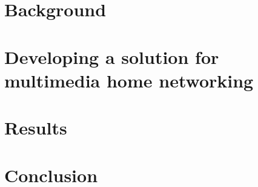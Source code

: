 \documentclass[english,12pt,a4paper,pdftex]{article}
\begin{document}
 

\clearpage

 \section{Background\label{chapter2}}
 


\clearpage

\section{Developing a solution for multimedia home networking\label{chapter3}}



\clearpage

\section{Results\label{chapter4}}



\clearpage

\section{Conclusion\label{chapter5}}



\clearpage



\cite{stateofHN}
\cite{AirPlay-spec}
\cite{next_generation}
\cite{DLNA_proxy2}
\cite{upnp}
\cite{standards-perspective}
\cite{DLNA_proxy}
\cite{end_user}
\cite{ipv6}



 

%
\end{document}
